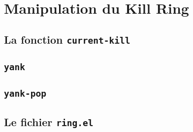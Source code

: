 \chapter{Manipulation du Kill Ring}

\section{La fonction \texttt{current-kill}}

\section{\texttt{yank}}

\section{\texttt{yank-pop}}

\section{Le fichier \texttt{ring.el}}
